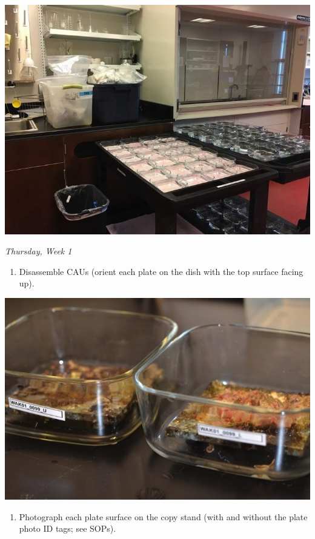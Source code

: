 \documentclass[]{book}
\providecommand{\tightlist}{%
  \setlength{\itemsep}{0pt}\setlength{\parskip}{0pt}}
\begin{document}
\includegraphics{images/DailyTasks5.jpg}

\emph{Thursday, Week 1}

\begin{enumerate}
\def\labelenumi{\arabic{enumi}.}
\tightlist
\item
  Disassemble CAUs (orient each plate on the dish with the top surface facing up).
\end{enumerate}

\includegraphics{images/DailyTasks6.jpg}

\begin{enumerate}
\def\labelenumi{\arabic{enumi}.}
\setcounter{enumi}{1}
\tightlist
\item
  Photograph each plate surface on the copy stand (with and without the plate photo ID tags; see SOPs).
\end{enumerate}
\end{document}
